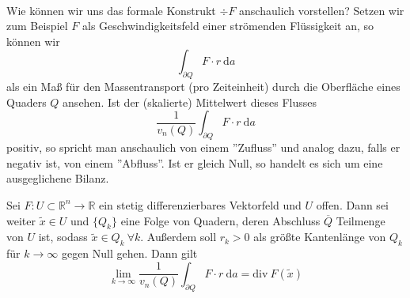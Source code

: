 \ \\
\linebreak
Wie können wir uns das formale Konstrukt $\div F$ 
anschaulich vorstellen? Setzen wir zum Beispiel $F$ als 
Geschwindigkeitsfeld einer strömenden Flüssigkeit an, so können 
wir  
\begin{equation*}
	\int_{\partial Q}F\cdot r \ \mathrm{d}a
\end{equation*}
als ein Maß für den Massentransport (pro Zeiteinheit) durch 
die Oberfläche eines Quaders $Q$ ansehen. Ist der (skalierte) 
Mittelwert dieses Flusses 
\begin{equation*}
	\frac{1}{v_n(Q)}\int_{\partial Q}F\cdot r \ \mathrm{d}a
\end{equation*}
positiv, so spricht man anschaulich von einem ''Zufluss'' und analog dazu, falls er negativ ist, von einem ''Abfluss''. Ist 
er gleich Null, so handelt es sich um eine ausgeglichene Bilanz.

\begin{lemma}
Sei $F:U\subset\mathbb{R}^n\rightarrow\mathbb{R}$ ein stetig 
differenzierbares Vektorfeld und $U$ offen. Dann sei weiter 
$\tilde{x}\in U$ und $\{Q_k\}$ eine Folge von Quadern, deren 
Abschluss $\overline{Q}$ Teilmenge von $U$ ist, sodass 
$\tilde{x}\in Q_k \ \forall k$. Außerdem soll $r_k>0$ als 
größte Kantenlänge von $Q_k$ für $k\rightarrow\infty$ gegen Null 
gehen. Dann gilt
\begin{equation}
	\lim\limits_{k\rightarrow\infty}\frac{1}{v_n(Q)}\int_{\partial Q} F\cdot r\ \mathrm{d}a = 
	\mathrm{div\ }F(\tilde{x})
\end{equation} 
\end{lemma}

